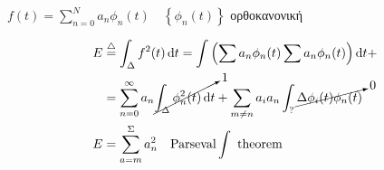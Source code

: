     \( 
    f(t) = \sum_{n=0}^N a_n\phi_n(t) \quad \left\lbrace \phi_n(t) \right\rbrace
     \)  ορθοκανονική
     
     \begin{align*} E &\overset{\triangle}{=} \int_\Delta f^2(t)\dif t
     = \int\left(
     \sum a_n\phi_n(t)\sum a_n\phi_n(t)
     \right)\dif t+
     \\ &= \sum_{n=0}^\infty a_n\cancelto{1}{\int_\Delta \phi_n^2(t)\dif t} +
     \sum_{m\neq n}a_ia_n\int_?\cancelto{0}{\Delta\phi_i(t)\phi_n(t)} \\
     E &= \sum_{a=m}^\Sigma a_n^2 \quad \text{Parseval}\int \text{ theorem}
     \end{align*}
